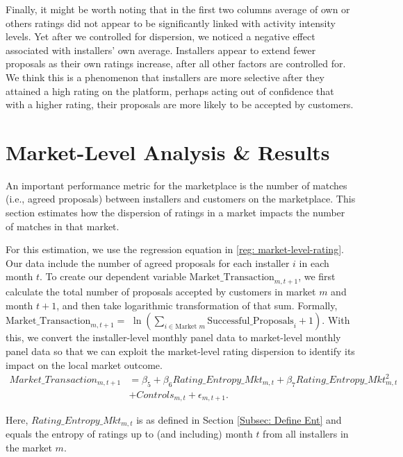 \documentclass[msom,blindrev]{informs3}
\begin{document}
Finally, it might be worth noting that in the first two columns average of own or others ratings did not appear to be significantly linked with activity intensity levels. Yet after we controlled for dispersion, we noticed a negative effect associated with installers' own average. Installers appear to extend fewer proposals as their own ratings increase, after all other factors are controlled for. We think this is a phenomenon that installers are more selective after they attained a high rating on the platform, perhaps acting out of confidence that with a higher rating, their proposals are more likely to be accepted by customers.

\section{Market-Level Analysis \& Results} \label{Sec: Market-level}

An important performance metric for the marketplace is the number of matches (i.e., agreed proposals) between installers and customers on the marketplace. This section estimates how the dispersion of ratings in a market impacts the number of matches in that market.

For this estimation, we use the regression equation in \eqref{reg: market-level-rating}. Our data include the number of agreed proposals for each installer $i$ in each month $t$. To create our dependent variable $\text{Market\_Transaction}_{m,t+1}$, we first calculate the total number of proposals accepted by customers in market $m$ and month $t+1$, and then take logarithmic transformation of that sum. Formally, $\text{Market\_Transaction}_{m,t+1} =$ $\ln\left( \sum_{i \in \text{Market\ } m} \text{Successful\_Proposals}_{i}+ 1 \right)$.  With this, we convert the installer-level monthly panel data to market-level monthly panel data so that we can exploit the market-level rating dispersion to identify its impact on the local market outcome.
\begin{align} \nonumber
   Market\_Transaction_{m,t+1} & =\beta_{5} + \beta_{6} Rating\_Entropy\_Mkt_{m,t}+ \beta_{7} Rating\_Entropy\_Mkt_{m,t} ^2\\ \label{reg: market-level-rating}
   &+ Controls_{m,t}  +\epsilon_{m,t+1}.
\end{align}

Here, $Rating\_Entropy\_Mkt_{m,t}$ is as defined in Section \ref{Subsec: Define Ent} and equals the entropy of ratings up to (and including) month $t$ from all installers in the market $m$.
\end{document}
